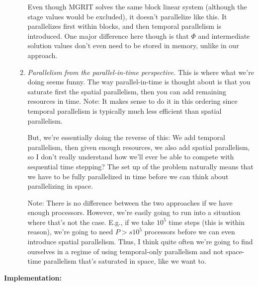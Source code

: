 \documentclass[a4paper,10pt]{article}
\begin{document}
\begin{itemize}
\begin{enumerate}
Even though MGRIT solves the same block linear system (although the stage values would be excluded), it doesn't parallelize like this. It parallelizes first within blocks, and then temporal parallelism is introduced. One major difference here though is that $\Phi$ and intermediate solution values don't even need to be stored in memory, unlike in our approach. 
\item \textit{Parallelism from the parallel-in-time perspective.} This is where what we're doing seems funny. The way parallel-in-time is thought about is that you saturate first the spatial parallelism, then you can add remaining resources in time. Note: It makes sense to do it in this ordering since temporal parallelism is typically much less efficient than spatial parallelism. 

But, we're essentially doing the reverse of this: We add temporal parallelism, then given enough resources, we also add spatial parallelism, so I don't really understand how we'll ever be able to compete with sequential time stepping? The set up of the problem naturally means that we have to be fully parallelized in time before we can think about parallelizing in space.

Note: There is no difference between the two approaches if we have enough processors. However, we're easily going to run into a situation where that's not the case. E.g., if we take $10^5$ time steps (this is within reason), we're going to need $P > s 10^5$ processors before we can even introduce spatial parallelism. Thus, I think quite often we're going to find ourselves in a regime of using temporal-only parallelism and not space-time parallelism that's saturated in space, like we want to. 
\end{enumerate}
\end{itemize}
\noindent\textbf{Implementation:}
\end{document}
